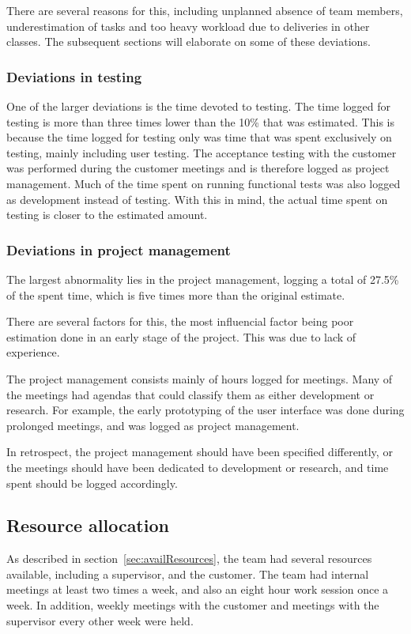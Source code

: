 There are several reasons for this, including unplanned absence of team members, underestimation of tasks and too heavy workload due to deliveries in other classes. The subsequent sections will elaborate on some of these deviations.

\subsubsection{Deviations in testing}
One of the larger deviations is the time devoted to testing. The time logged for testing is more than three times lower than the 10\% that was estimated. This is because the time logged for testing only was time that was spent exclusively on testing, mainly including user testing. The acceptance testing with the customer was performed during the customer meetings and is therefore logged as project management. Much of the time spent on running functional tests was also logged as development instead of testing. With this in mind, the actual time spent on testing is closer to the estimated amount.

\subsubsection{Deviations in project management}
The largest abnormality lies in the project management, logging a total of 27.5\% of the spent time, which is five times more than the original estimate. 

There are several factors for this, the most influencial factor being poor estimation done in an early stage of the project. This was due to lack of experience. 

The project management consists mainly of hours logged for meetings. Many of the meetings had agendas that could classify them as either development or research. For example, the early prototyping of the user interface was done during prolonged meetings, and was logged as project management. 

In retrospect, the project management should have been specified differently, or the meetings should have been dedicated to development or research, and time spent should be logged accordingly.

\subsection{Resource allocation}
As described in section~\ref{sec:availResources}, the team had several resources available, including a supervisor, and the customer. The team had internal meetings at least two times a week, and also an eight hour work session once a week. In addition, weekly meetings with the customer and meetings with the supervisor every other week were held.

